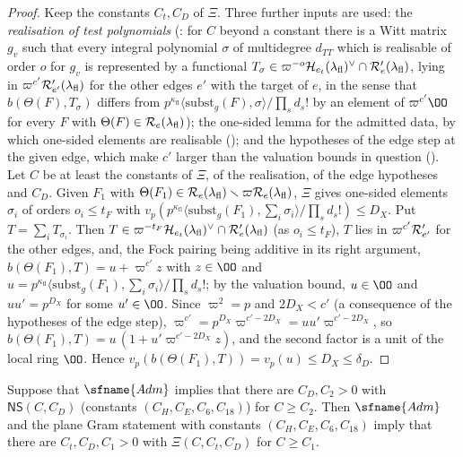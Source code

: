\begin{proof}
Keep the constants $C_t,C_D$ of $\Xi$. Three further inputs are used: the \emph{realisation of test polynomials}
(: for $C$ beyond a constant there is a Witt matrix $g_v$ such that
every integral polynomial $\sigma$ of multidegree $d_{TT}$ which is realisable of order $o$ for $g_v$ is represented by a
functional $T_\sigma\in\varpi^{-o}\mathcal H_{e_t}(\lambda_{\mathrm{fl}})^\vee\cap\mathcal R'_e(\lambda_{\mathrm{fl}})$, lying in
$\varpi^{c'}\mathcal R'_{e'}(\lambda_{\mathrm{fl}})$ for the other edges $e'$ with the target of $e$, in the sense that
$b(\Theta(F),T_\sigma)$ differs from $p^{\kappa_{\mathrm{fl}}}\langle\mathrm{subst}_g(F),\sigma\rangle/\prod_sd_s!$ by an element of
$\varpi^{c'}\OO$ for every $F$ with $\Theta(F)\in\mathcal R_e(\lambda_{\mathrm{fl}})$);
the one-sided lemma for the admitted data, by which one-sided elements are realisable
(); and the hypotheses of the edge
step at the given edge, which make $c'$ larger than the valuation bounds in question
(). Let $C$ be at least the constants of $\Xi$, of the realisation, of the
edge hypotheses and $C_D$. Given $F_1$ with
$\Theta(F_1)\in\mathcal R_e(\lambda_{\mathrm{fl}})\smallsetminus\varpi\mathcal R_e(\lambda_{\mathrm{fl}})$, $\Xi$ gives one-sided elements
$\sigma_i$ of orders $o_i\le t_F$ with $v_p(p^{\kappa_{\mathrm{fl}}}\langle\mathrm{subst}_g(F_1),\sum_i\sigma_i\rangle/\prod_sd_s!)\le
D_X$. Put $T=\sum_iT_{\sigma_i}$. Then $T\in\varpi^{-t_F}\mathcal H_{e_t}(\lambda_{\mathrm{fl}})^\vee\cap\mathcal R'_e(\lambda_{\mathrm{fl}})$ (as
$o_i\le t_F$), $T$ lies in $\varpi^{c'}\mathcal R'_{e'}$ for the other edges, and, the Fock pairing being additive in its right
argument, $b(\Theta(F_1),T)=u+\varpi^{c'}z$ with $z\in\OO$ and $u=p^{\kappa_{\mathrm{fl}}}\langle\mathrm{subst}_g(F_1),\sum_i\sigma_i\rangle/
\prod_sd_s!$; by the valuation bound, $u\in\OO$ and $uu'=p^{D_X}$ for some $u'\in\OO$. Since $\varpi^2=p$ and $2D_X<c'$ (a
consequence of the hypotheses of the edge step), $\varpi^{c'}=p^{D_X}\varpi^{c'-2D_X}=uu'\varpi^{c'-2D_X}$, so
$b(\Theta(F_1),T)=u\,(1+u'\varpi^{c'-2D_X}z)$, and the second factor is a unit of the local ring $\OO$. Hence
$v_p(b(\Theta(F_1),T))=v_p(u)\le D_X\le\delta_D$.
\end{proof}

\begin{proposition}\label{pf:linkG:xi}
Suppose that $\sfname{Adm}$ implies that there are $C_D,C_2>0$ with $\mathsf{NS}(C,C_D)$ (constants $(C_H,C_E,C_6,C_{18})$) for
$C\ge C_2$. Then $\sfname{Adm}$ and the plane Gram statement with constants $(C_H,C_E,C_6,C_{18})$ imply that there are
$C_t,C_D,C_1>0$ with $\Xi(C,C_t,C_D)$ for $C\ge C_1$.
\end{proposition}


